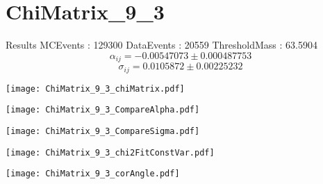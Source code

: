 \documentclass[a4paper,12pt]{article}
\begin{document}
\section{ChiMatrix\_9\_3}
\begin{minipage}{0.49\linewidth} Results \newline
MCEvents : 129300\newline
DataEvents : 20559 \newline
ThresholdMass : 63.5904\\
$$\alpha_{ij} = -0.00547073\pm 0.000487753$$
$$\sigma_{ij} = 0.0105872\pm 0.00225232$$
\end{minipage}\hfill
\begin{minipage}{0.49\linewidth} 
\texttt{[image: ChiMatrix\_9\_3\_chiMatrix.pdf]}\\
\end{minipage}
\hfill
\begin{minipage}{0.49\linewidth} 
\texttt{[image: ChiMatrix\_9\_3\_CompareAlpha.pdf]}\\
\end{minipage}
\hfill
\begin{minipage}{0.49\linewidth} 
\texttt{[image: ChiMatrix\_9\_3\_CompareSigma.pdf]}\\
\end{minipage}
\begin{minipage}{0.49\linewidth} 
\texttt{[image: ChiMatrix\_9\_3\_chi2FitConstVar.pdf]}\\
\end{minipage}
\hfill
\begin{minipage}{0.49\linewidth} 
\texttt{[image: ChiMatrix\_9\_3\_corAngle.pdf]}\\
\end{minipage}
\end{document}
